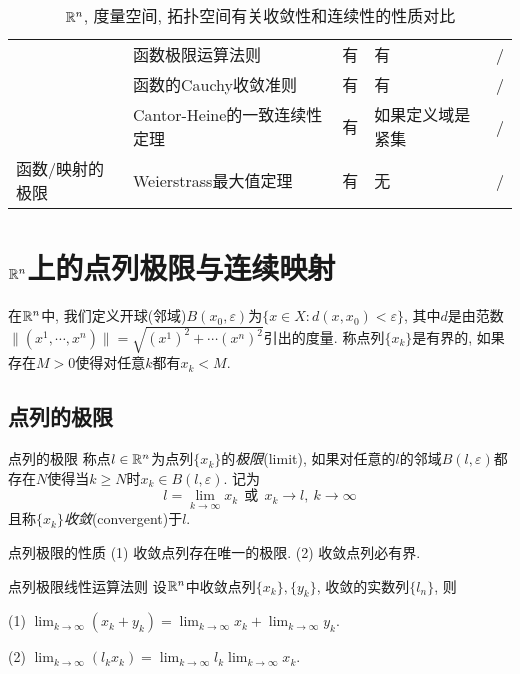 \begin{table}[h]
\begin{tabular}{|l|l|p{2cm}|l|p{2cm}|}
{ }                             & { 函数极限运算法则}              & { 有}                                              & { 有}         & /                \\
{ }                             & { 函数的Cauchy收敛准则}         & { 有}                                              & { 有}         & /                \\
{ }                             & { Cantor-Heine的一致连续性定理}  & { 有}                                              & { 如果定义域是紧集}  & /                \\
\multirow{-5}{*}{{ 函数/映射的极限}}   & Weierstrass最大值定理                             & 有                                                                     & 无                                & /  \\ \hline              
\end{tabular}
\caption{$\mathbb{R} ^n$, 度量空间, 拓扑空间有关收敛性和连续性的性质对比}
\end{table}

\section{$\mathbb{R} ^n$上的点列极限与连续映射}

在$\mathbb{R} ^n$中, 我们定义开球(邻域)$B(x_0,\varepsilon)$为$\{ x \in X:d(x,x_0)<\varepsilon \}$, 其中$d$是由范数$\| (x^1,\cdots ,x^n) \| = \sqrt{(x^1)^2+\cdots (x^n)^2}$引出的度量. 称点列$\{ x_k \}$是有界的, 如果存在$M>0$使得对任意$k$都有$x_k<M$. 

\subsection{点列的极限}

\begin{definition}{点列的极限}
	称点$l \in \mathbb{R} ^n$为点列$\{ x_k \}$的\textit{极限}(limit), 如果对任意的$l$的邻域$B(l,\varepsilon)$都存在$N$使得当$k \geq N$时$x_k \in B(l,\varepsilon)$. 记为$$l = \lim_{k \to \infty} x_k ~~ \text{或} ~~ x_k \to l,~k \to \infty$$且称$\{ x_k \}$\textit{收敛}(convergent)于$l$. 
\end{definition}

\begin{proposition}{点列极限的性质}
	(1) 收敛点列存在唯一的极限. \qquad (2) 收敛点列必有界. 
\end{proposition}

\begin{proposition}{点列极限线性运算法则}
	设$\mathbb{R} ^n$中收敛点列$\{ x_k \},\{ y_k \}$, 收敛的实数列$\{ l_n \}$, 则
	
	(1) $\lim_{k\to \infty} (x_k+y_k) = \lim_{k\to \infty} x_k + \lim_{k\to \infty} y_k$. 
	
	(2) $\lim_{k\to \infty} (l_kx_k) = \lim_{k\to \infty} l_k \lim_{k\to \infty} x_k$. 
\end{proposition}

